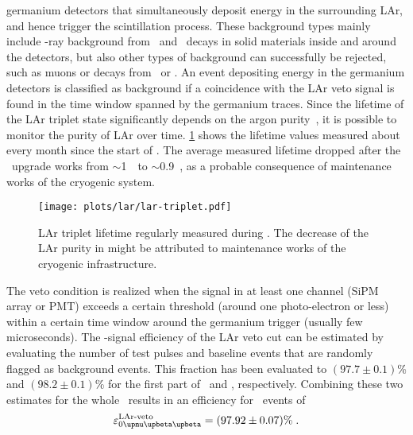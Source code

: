 germanium detectors that simultaneously deposit energy in the surrounding LAr, and hence
trigger the scintillation process. These background types mainly include \g-ray background
from \Ra\ and \Th\ decays in solid materials inside and around the detectors, but also
other types of background can successfully be rejected, such as muons or decays from \Arh\
or \kvz. An event depositing energy in the germanium detectors is classified as background
if a coincidence with the LAr veto signal is found in the time window spanned by the
germanium traces. Since the lifetime of the LAr triplet state significantly depends on the
argon purity~\cite{Amsler2007}, it is possible to monitor the purity of LAr over time.
\cref{fig:lar:triplet-lifetime} shows the lifetime values measured about every month since
the start of \phasetwo. The average measured lifetime dropped after the \phasetwop\
upgrade works from $\sim$1~\mus\ to $\sim$0.9~\mus, as a probable consequence of
maintenance works of the cryogenic system.
\begin{figure}
  \centering
  \texttt{[image: plots/lar/lar-triplet.pdf]}
  \caption{%
    LAr triplet lifetime regularly measured during \phasetwo. The decrease of the LAr
    purity in  might be attributed to maintenance works of the cryogenic
    infrastructure.
  }\label{fig:lar:triplet-lifetime}
\end{figure}
The veto condition is realized when the signal in at least one channel (SiPM array or PMT)
exceeds a certain threshold (around one photo-electron or less) within a certain time
window around the germanium trigger (usually few microseconds). The \onbb-signal
efficiency of the LAr veto cut can be estimated by evaluating the number of test pulses
and baseline events that are randomly flagged as background events. This fraction has been
evaluated to $(97.7 \pm 0.1)$\% and $(98.2 \pm 0.1)$\% for the first part of \phasetwo\
and \phasetwop, respectively. Combining these two estimates for the whole \phasetwo\
results in an efficiency for \onbb\ events of
\[
  \epsilon_\onbbM^\text{LAr-veto} = (97.92 \pm 0.07)\% \;.
\]


